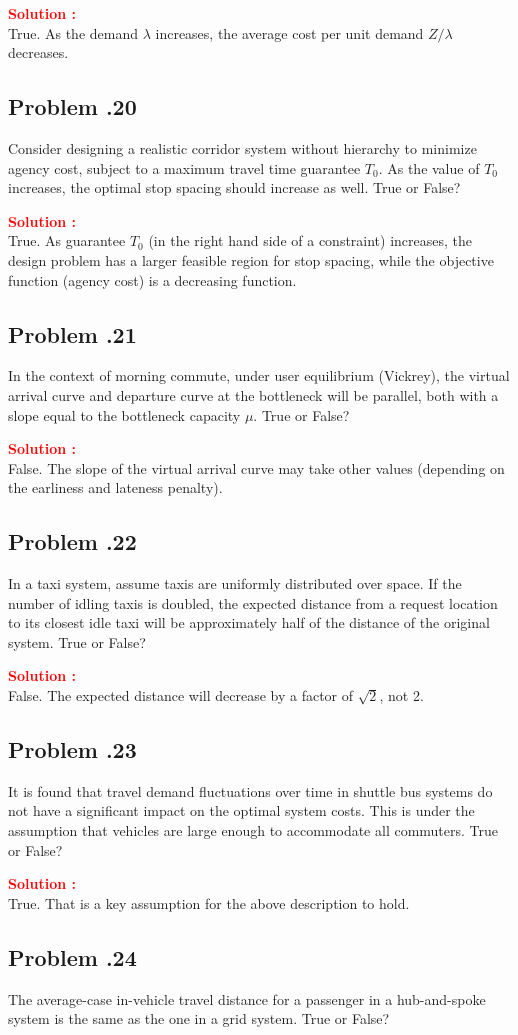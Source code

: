 \documentclass[12pt]{article}
\newcommand{\customsubsection}[1]{
  \subsection*{Problem \thesection.#1}
}
\begin{document}
\textbf{\textcolor{red}{Solution :}} \\
True. As the demand $\lambda$ increases, the average cost per unit demand $ Z/\lambda$ decreases.
\newpage

\customsubsection{20}
Consider designing a realistic corridor system without hierarchy to minimize agency cost, subject to a maximum travel time guarantee $T_0$. As the value of $T_0$ increases, the optimal stop spacing should increase as well. True or False?


\textbf{\textcolor{red}{Solution :}} \\
True. As guarantee $T_0$ (in the right hand side of a constraint) increases, the design problem has a larger feasible region for stop spacing, while the objective function (agency cost) is a decreasing function.
\newpage

\customsubsection{21}
In the context of morning commute, under user equilibrium (Vickrey), the virtual arrival curve and departure curve at the bottleneck will be parallel, both with a slope equal to the bottleneck capacity $\mu$. True or False?

\textbf{\textcolor{red}{Solution :}} \\
False. The slope of the virtual arrival curve may take other values (depending on the earliness and lateness penalty).
\newpage



\customsubsection{22}
In a taxi system, assume taxis are uniformly distributed over space. If the number of idling taxis is doubled, the expected distance from a request location to its closest idle taxi will be approximately half of the distance of the original system. True or False?

\textbf{\textcolor{red}{Solution :}} \\
False. The expected distance will decrease by a factor of $\sqrt{2}$, not 2.


\newpage

\customsubsection{23}
It is found that travel demand fluctuations over time in shuttle bus systems do not have a significant impact on the optimal system costs. This is under the assumption that vehicles are large enough to accommodate all commuters. True or False?

\textbf{\textcolor{red}{Solution :}} \\
True. That is a key assumption for the above description to hold. 
\newpage


\customsubsection{24}
The average-case in-vehicle travel distance for a passenger in a hub-and-spoke system is the same as the one in a grid system. True or False?
\end{document}
